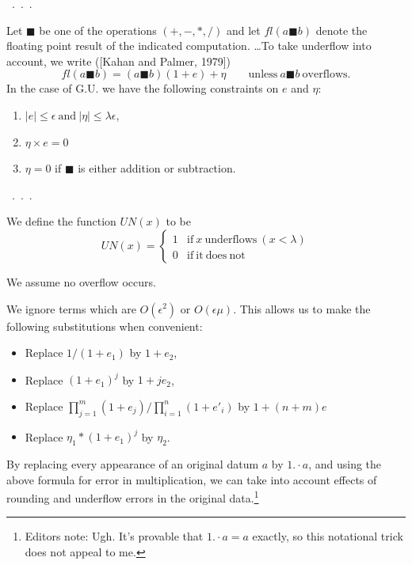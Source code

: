 \documentclass[a4paper]{article}
\begin{document}
~.~.~.

\newcommand\fl[1]{\ensuremath{\mathit{fl}(#1)}}

Let $\blacksquare$ be one of the operations $(+,-,\ast,/)$ and let
$\fl{a \blacksquare b}$ denote the floating point result of the indicated
computation. \ldots To take underflow into account, we write ([Kahan and Palmer, 1979])
\begin{equation}\tag{11}
\fl{a \blacksquare b} = (a \blacksquare b)(1 + e)+\eta\qquad
\mathrm{unless}~a\blacksquare b ~\mathrm{overflows.}
\end{equation}
In the case of G.U. we have the following constraints on $e$ and $\eta$:
\begin{enumerate}
\item[(1)] $|e|\le \epsilon ~\mathrm{and}~ |\eta|\le \lambda \epsilon$,
\item[(2)] $\eta \times e = 0$
\item[(3)] $\eta=0$ if $\blacksquare$ is either addition or subtraction.
\end{enumerate}

~.~.~.

We define the function $\mathit{UN}(x)$ to be
\[
UN(x)=\left\lbrace\begin{array}{ll}1 & \mathrm{if}~x~\mathrm{underflows}~(x<\lambda)\\
    0 & \mathrm{if~it~does~not}\end{array}\right.
  \]

We assume no overflow occurs.

We ignore terms which are $O(\epsilon^2)$ or $O(\epsilon\mu)$.  This allows us
to make the following substitutions when convenient:
\begin{itemize}
\item[] Replace $1/(1+e_1)$ by $1+e_2$,
\item[] Replace $(1+e_1)^j$ by $1 + je_2$,
\item[] Replace $\prod_{j=1}^m(1+e_j)/\prod_{i=1}^n (1+e'_i)$ by $1+(n+m)e$
\item[] Replace $\eta_1 \ast (1+e_1)^j$ by $\eta_2$.
\end{itemize}

By replacing every appearance of an original datum $a$ by $1. \cdot a$,
and using the above formula for error in multiplication, we can take into
account effects of rounding and underflow errors in the original data.\footnote{Editors note: Ugh.  It's provable that $1. \cdot a=a$ exactly, so this notational trick does not
appeal to me.}
\end{document}
